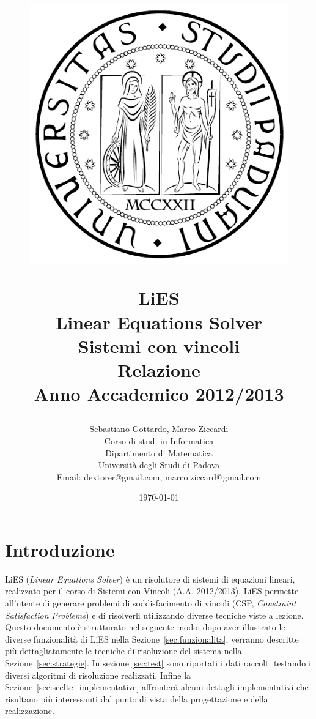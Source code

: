 \documentclass[10pt, a4paper]{article}
\title{
\begin{figure}[ht]
\begin{center}
\includegraphics[scale=0.6]{./common-images/unipd_logo.pdf}
\end{center}
\end{figure}
LiES \\ Linear Equations Solver \\ Sistemi con vincoli \\\vspace{10mm} \textbf{Relazione}\\\vspace{0.4cm}
\Large{Anno Accademico 2012/2013}}
\author{Sebastiano Gottardo, Marco Ziccardi\\
Corso di studi in Informatica\\
Dipartimento di Matematica\\
Università degli Studi di Padova\\
Email: dextorer@gmail.com, marco.ziccard@gmail.com }
\date{\today} %
\begin{document}
\maketitle %



\newpage
\tableofcontents
\newpage


\section{Introduzione}
\label{sec:introduzione}

LiES (\textit{Linear Equations Solver}) è un risolutore di sistemi di equazioni lineari, realizzato per il corso di Sistemi con Vincoli (A.A. 2012/2013). LiES permette all'utente di generare problemi di soddisfacimento di vincoli (CSP, \textit{Constraint Satisfaction Problems}) e di risolverli utilizzando diverse tecniche viste a lezione.\\

Questo documento è strutturato nel seguente modo: dopo aver illustrato le diverse funzionalità di LiES nella Sezione~\ref{sec:funzionalita}, verranno descritte più dettagliatamente le tecniche di risoluzione del sistema nella Sezione~\ref{sec:strategie}. In sezione \ref{sec:test} sono riportati i dati raccolti testando i diversi algoritmi di risoluzione realizzati. Infine la Sezione~\ref{sec:scelte_implementative} affronterà alcuni dettagli implementativi che risultano più interessanti dal punto di vista della progettazione e della realizzazione.

\end{document}
